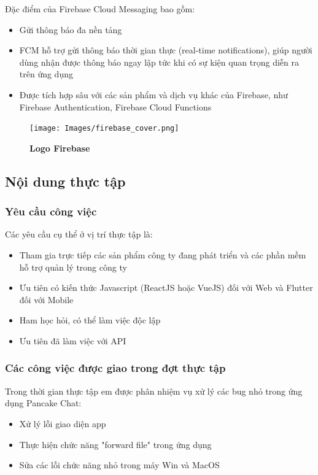Đặc điểm của Firebase Cloud Messaging bao gồm:
\begin{itemize} 
  \item Gửi thông báo đa nền tảng
  \item FCM hỗ trợ gửi thông báo thời gian thực (real-time notifications), giúp người dùng nhận được thông báo ngay lập tức khi có sự kiện quan trọng diễn ra trên ứng dụng
  \item Được tích hợp sâu với các sản phẩm và dịch vụ khác của Firebase, như Firebase Authentication, Firebase Cloud Functions
\end{itemize}

\begin{figure}[H]
  \centering
  \texttt{[image: Images/firebase\_cover.png]}
  \caption[Logo Firebase]{\bfseries \fontsize{12pt}{0pt}
  \selectfont Logo Firebase}
  \label{firebase_cover} 
\end{figure}

\subsection{Nội dung thực tập}
\subsubsection{Yêu cầu công việc}
Các yêu cầu cụ thể ở vị trí thực tập là:
  \begin{itemize}
    \item Tham gia trực tiếp các sản phẩm công ty đang phát triển và các phần mềm hỗ trợ quản lý trong công ty
    \item Ưu tiên có kiến thức Javascript (ReactJS hoặc VueJS) đối với Web và Flutter đối với Mobile
    \item Ham học hỏi, có thể làm việc độc lập
    \item Ưu tiên đã làm việc với API
  \end{itemize}

\subsubsection{Các công việc được giao trong đợt thực tập}
Trong thời gian thực tập em được phân nhiệm vụ xử lý các bug nhỏ trong ứng dụng Pancake Chat:
\begin{itemize}
  \item Xử lý lỗi giao diện app
  \item Thực hiện chức năng "forward file" trong ứng dụng
  \item Sửa các lỗi chức năng nhỏ trong máy Win và MacOS
\end{itemize}

